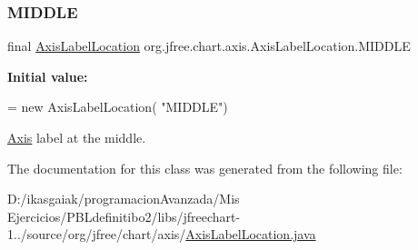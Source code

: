 \subsubsection{\texorpdfstring{M\+I\+D\+D\+LE}{MIDDLE}}
{\footnotesize\ttfamily final \mbox{\hyperlink{classorg_1_1jfree_1_1chart_1_1axis_1_1_axis_label_location}{Axis\+Label\+Location}} org.\+jfree.\+chart.\+axis.\+Axis\+Label\+Location.\+M\+I\+D\+D\+LE\hspace{0.3cm}{\ttfamily [static]}}

{\bfseries Initial value\+:}
\begin{DoxyCode}
= \textcolor{keyword}{new} AxisLabelLocation(
            \textcolor{stringliteral}{"MIDDLE"})
\end{DoxyCode}
\mbox{\hyperlink{classorg_1_1jfree_1_1chart_1_1axis_1_1_axis}{Axis}} label at the middle. 

The documentation for this class was generated from the following file\+:\begin{DoxyCompactItemize}
\item 
D\+:/ikasgaiak/programacion\+Avanzada/\+Mis Ejercicios/\+P\+B\+Ldefinitibo2/libs/jfreechart-\/1../source/org/jfree/chart/axis/\mbox{\hyperlink{_axis_label_location_8java}{Axis\+Label\+Location.\+java}}\end{DoxyCompactItemize}
